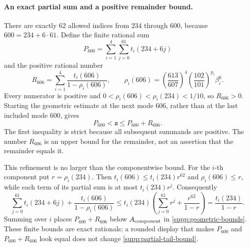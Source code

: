 \paragraph{An exact partial sum and a positive remainder bound.}
There are exactly $62$ allowed indices from $234$ through $600$, because
$600=234+6\cdot61$.  Define the finite rational sum
\begin{equation}
 P_{600}=\sum_{i=1}^4\sum_{j=0}^{61}t_i(234+6j)
 \label{supp:partial-600}
\end{equation}
and the positive rational number
\begin{equation}
 R_{606}=\sum_{i=1}^4\frac{t_i(606)}{1-\rho_i(606)},\qquad
 \rho_i(606)=\left(\frac{613}{607}\right)^4
             \left(\frac{102}{101}\right)^{p_i}\beta_i^6.
 \label{supp:remainder-606}
\end{equation}
Every numerator is positive and
$0<\rho_i(606)<\rho_i(234)<1/10$, so $R_{606}>0$.  Starting the
geometric estimate at the next mode $606$, rather than at the last included
mode $600$, gives
\begin{equation}
 P_{600}<\mathfrak a\leq P_{600}+R_{606}.
 \label{supp:partial-tail-bound}
\end{equation}
The first inequality is strict because all subsequent summands are
positive.  The number $R_{606}$ is an upper bound for the remainder, not
an assertion that the remainder equals it.

This refinement is no larger than the componentwise bound.  For the
$i$-th component put $r=\rho_i(234)$.  Then
$t_i(606)\leq t_i(234)r^{62}$ and $\rho_i(606)\leq r$, while each term
of its partial sum is at most $t_i(234)r^j$.  Consequently
\[
 \sum_{j=0}^{61}t_i(234+6j)
       +\frac{t_i(606)}{1-\rho_i(606)}
 \leq t_i(234)\left(\sum_{j=0}^{61}r^j+
                         \frac{r^{62}}{1-r}\right)
 =\frac{t_i(234)}{1-r}.
\]
Summing over $i$ places $P_{600}+R_{606}$ below
$A_{\rm component}$ in \eqref{supp:geometric-bounds}.  These finite bounds
are exact rationals; a rounded display that makes
$P_{600}$ and $P_{600}+R_{606}$ look equal does not change
\eqref{supp:partial-tail-bound}.

